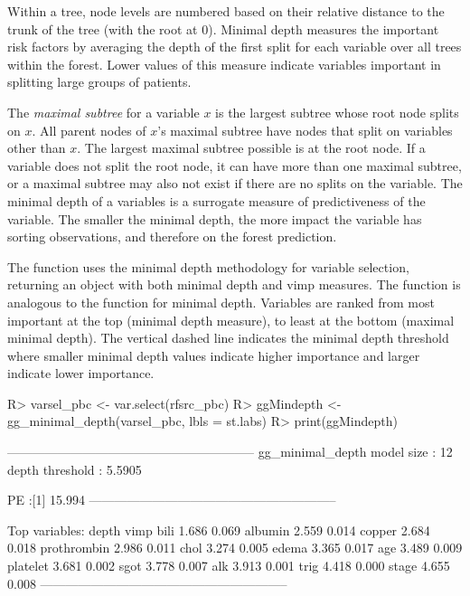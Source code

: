\documentclass[nojss]{jss}\usepackage[]{graphicx}\usepackage[]{color}
\begin{document}
Within a tree, node levels are numbered based on their relative distance to the trunk of the tree (with the root at 0). Minimal depth measures the important risk factors by averaging the depth of the first split for each variable over all trees within the forest. Lower values of this measure indicate variables important in splitting large groups of patients. 

The \emph{maximal subtree} for a variable $x$ is the largest subtree whose root node splits on $x$. All parent nodes of $x$'s maximal subtree have nodes that split on variables other than $x$. The largest maximal subtree possible is at the root node. If a variable does not split the root node, it can have more than one maximal subtree, or a maximal subtree may also not exist if there are no splits on the variable. The minimal depth of a variables is a surrogate measure of predictiveness of the variable. The smaller the minimal depth, the more impact the variable has sorting observations, and therefore on the forest prediction. 

The   function uses the minimal depth methodology for variable selection, returning an object with both minimal depth and vimp measures. The   function is analogous to the  function for minimal depth. Variables are ranked from most important at the top (minimal depth measure), to least at the bottom (maximal minimal depth). The vertical dashed line indicates the minimal depth threshold where smaller minimal depth values indicate higher importance and larger indicate lower importance.

\begin{Schunk}
\begin{Sinput}
R> varsel_pbc <- var.select(rfsrc_pbc)
R> ggMindepth <- gg_minimal_depth(varsel_pbc, lbls = st.labs)
R> print(ggMindepth)
\end{Sinput}
\end{Schunk}

\begin{Schunk}
\begin{Soutput}
-----------------------------------------------------------
gg_minimal_depth
model size         : 12 
depth threshold    : 5.5905 

PE :[1] 15.994
-----------------------------------------------------------

Top variables:
            depth  vimp
bili        1.686 0.069
albumin     2.559 0.014
copper      2.684 0.018
prothrombin 2.986 0.011
chol        3.274 0.005
edema       3.365 0.017
age         3.489 0.009
platelet    3.681 0.002
sgot        3.778 0.007
alk         3.913 0.001
trig        4.418 0.000
stage       4.655 0.008
-----------------------------------------------------------
\end{Soutput}
\end{Schunk}
\end{document}

